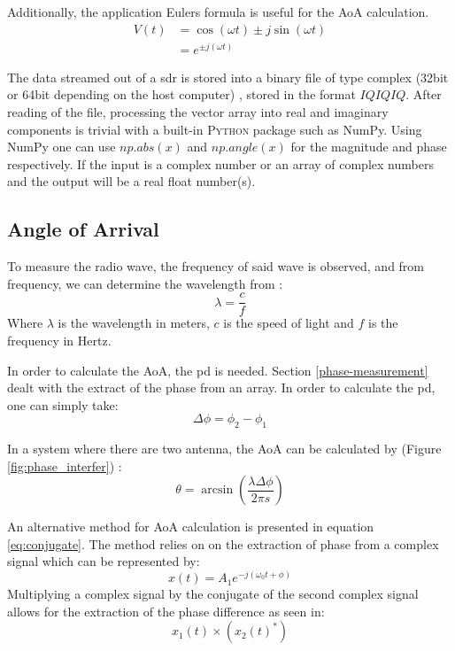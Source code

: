 \documentclass[class=report,11pt,crop=false]{standalone}
\begin{document}
Additionally, the application Eulers formula \cite{engineers-dsp} is useful for the \gls{AoA} calculation. 
\begin{equation}
    \begin{split}
        V(t) & = \cos{(\omega t)} \pm j \sin{(\omega t)} \\
        & = e^{ \pm j (\omega t)}
    \end{split}
\end{equation}

The data streamed out of a \gls{sdr} is stored into a binary file of type complex (32bit or 64bit depending on the host computer) \cite{gnuradio}, stored in the format $IQIQIQ$. After reading of the file, processing the vector array into real and imaginary components is trivial with a built-in \textsc{Python} package such as NumPy. Using NumPy one can use $np.abs(x)$ and $np.angle(x)$ for the magnitude and phase respectively. If the input is a complex number or an array of complex numbers and the output will be a real float number(s).

\subsection{Angle of Arrival}
To measure the radio wave, the frequency of said wave is observed, and from frequency, we can determine the wavelength from \cite{radio-waves}:
\begin{equation}
    \lambda = \frac{c}{f}
\end{equation}
Where $\lambda$ is the wavelength in meters, $c$ is the speed of light and $f$ is the frequency in Hertz. 

In order to calculate the \gls{AoA}, the \gls{pd} is needed. Section \ref{phase-measurement} dealt with the extract of the phase from an array. In order to calculate the \gls{pd}, one can simply take:
\begin{equation}
    \Delta \phi = \phi_2 - \phi_1
\end{equation}

In a system where there are two antenna, the \gls{AoA} can be calculated by (Figure \ref{fig:phase_interfer}) \cite{phase-diff-calc}:
\begin{equation}
    \theta = \arcsin(\frac{\lambda \Delta \phi}{2 \pi s} ) 
    \label{eq:pd-theta}
\end{equation}


An alternative method for \gls{AoA} calculation is presented in equation \ref{eq:conjugate}. The method relies on on the extraction of phase from a complex signal which can be represented by:
\begin{equation*}
    x(t) = A_1 e^{-j(\omega_0t + \phi)}
\end{equation*}
Multiplying a complex signal by the conjugate of the second complex signal allows for the extraction of the phase difference as seen in:
\begin{equation}
    x_1(t) \times (x_2(t)^*)
    \label{eq:conjugate}
\end{equation}
\end{document}
